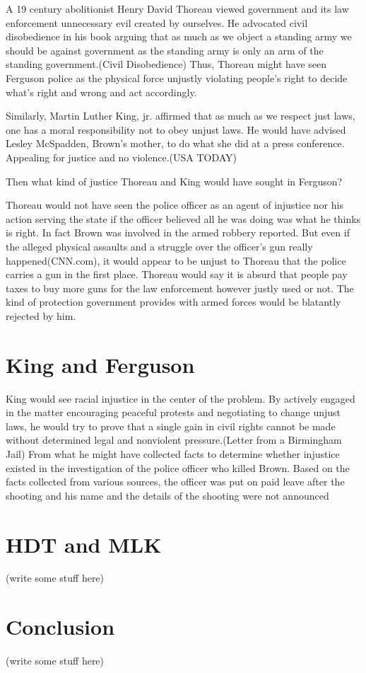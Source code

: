 \documentclass{article}
\begin{document}
A 19 century abolitionist Henry David Thoreau viewed government and its law
enforcement unnecessary evil created by ourselves. He advocated civil
disobedience in his book arguing that as much as we object a standing army we
should be against government as the standing army is only an arm of the standing
government.(Civil Disobedience) Thus, Thoreau might have seen Ferguson police as
the physical force unjustly violating people's right to decide what's right and
wrong and act accordingly.  

Similarly, Martin Luther King, jr. affirmed that as much as we respect just
laws, one has a moral responsibility not to obey unjust laws. He would have
advised Lesley McSpadden, Brown's mother, to do what she did at a press 
conference. Appealing for justice and no violence.(USA TODAY) 

Then what kind of justice Thoreau and King would have sought in Ferguson?

Thoreau would not have seen the police officer as an agent of injustice nor his
action serving the state if the officer believed all he was doing was what he
thinks is right. In fact Brown was involved in the armed robbery reported. But
even if the alleged physical assaults and a struggle over the officer's gun
really happened(CNN.com), it would appear to be unjust to Thoreau that the
police carries a gun in the first place. Thoreau would say it is absurd that
people pay taxes to buy more guns for the law enforcement however justly used or
not. The kind of protection government provides with armed forces would be
blatantly rejected by him.     

\section{King and Ferguson}

King would see racial injustice in the center of the problem. By actively
engaged in the matter encouraging peaceful protests and negotiating to change
unjust laws, he would try to prove that a single gain in civil rights cannot be
made without determined legal and nonviolent pressure.(Letter from a Birmingham
Jail) From what he might have collected facts to determine whether injustice
existed in the investigation of the police officer who killed Brown. Based on
the facts collected from various sources, the officer was put on paid leave
after the shooting and his name and the details of the shooting were not
announced 

\section{HDT and MLK}
(write some stuff here)

\section{Conclusion}

(write some stuff here)
\end{document}
